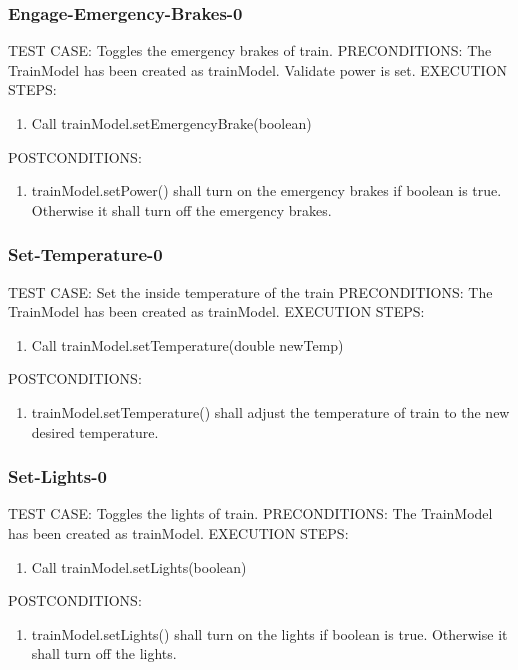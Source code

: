 \documentclass{scrreprt}
\begin{document}
\subsubsection{Engage-Emergency-Brakes-0}
TEST CASE: Toggles the emergency brakes of train.
PRECONDITIONS: The TrainModel has been created as trainModel. Validate power is set.
EXECUTION STEPS:
\begin{enumerate}
	\item Call trainModel.setEmergencyBrake(boolean)
\end{enumerate}
POSTCONDITIONS:
\begin{enumerate}
	\item trainModel.setPower() shall turn on the emergency brakes if boolean is true. Otherwise it shall turn off the emergency brakes.
\end{enumerate}

\subsubsection{Set-Temperature-0}
TEST CASE: Set the inside temperature of the train
PRECONDITIONS: The TrainModel has been created as trainModel.
EXECUTION STEPS:
\begin{enumerate}
	\item Call trainModel.setTemperature(double newTemp)
\end{enumerate}
POSTCONDITIONS:
\begin{enumerate}
	\item trainModel.setTemperature() shall adjust the temperature of train to the new desired temperature.
\end{enumerate}

\subsubsection{Set-Lights-0}
TEST CASE: Toggles the lights of train.
PRECONDITIONS: The TrainModel has been created as trainModel.
EXECUTION STEPS:
\begin{enumerate}
	\item Call trainModel.setLights(boolean)
\end{enumerate}
POSTCONDITIONS:
\begin{enumerate}
	\item trainModel.setLights() shall turn on the lights if boolean is true. Otherwise it shall turn off the lights.
\end{enumerate}
\end{document}
